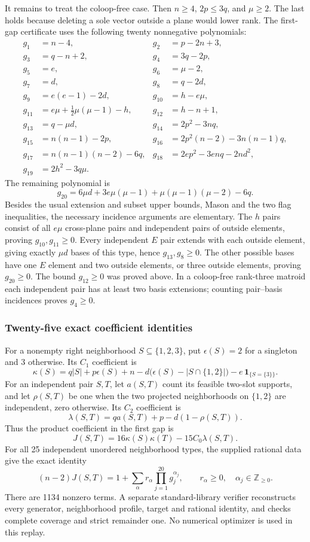 \documentclass[11pt,a4paper]{article}
\theoremstyle{remark}\newtheorem{remark}[theorem]{Remark}
\begin{document}
It remains to treat the coloop-free case. Then $n\ge4$, $2p\le3q$, and $\mu\ge2$. The last holds because deleting a sole vector outside a plane would lower rank. The first-gap certificate uses the following twenty nonnegative polynomials:
\begin{align*}
g_1&=n-4,&g_2&=p-2n+3,\\
g_3&=q-n+2,&g_4&=3q-2p,\\
g_5&=e,&g_6&=\mu-2,\\
g_7&=d,&g_8&=q-2d,\\
g_9&=e(e-1)-2d,&g_{10}&=h-e\mu,\\
g_{11}&=e\mu+\tfrac12\mu(\mu-1)-h,&g_{12}&=h-n+1,\\
g_{13}&=q-\mu d,&g_{14}&=2p^2-3nq,\\
g_{15}&=n(n-1)-2p,&g_{16}&=2p^2(n-2)-3n(n-1)q,\\
g_{17}&=n(n-1)(n-2)-6q,&g_{18}&=2ep^2-3enq-2nd^2,\\
g_{19}&=2h^2-3q\mu.&&
\end{align*}
The remaining polynomial is
\[
 g_{20}=6\mu d+3e\mu(\mu-1)+\mu(\mu-1)(\mu-2)-6q.
\]
Besides the usual extension and subset upper bounds, Mason and the two flag inequalities, the necessary incidence arguments are elementary. The $h$ pairs consist of all $e\mu$ cross-plane pairs and independent pairs of outside elements, proving $g_{10},g_{11}\ge0$. Every independent $E$ pair extends with each outside element, giving exactly $\mu d$ bases of this type, hence $g_{13},g_8\ge0$. The other possible bases have one $E$ element and two outside elements, or three outside elements, proving $g_{20}\ge0$. The bound $g_{12}\ge0$ was proved above. In a coloop-free rank-three matroid each independent pair has at least two basis extensions; counting pair--basis incidences proves $g_4\ge0$.

\subsubsection{Twenty-five exact coefficient identities}
For a nonempty right neighborhood $S\subseteq\{1,2,3\}$, put $\epsilon(S)=2$ for a singleton and $3$ otherwise. Its $C_1$ coefficient is
\[
 \kappa(S)=q|S|+p\epsilon(S)+n
 -d\bigl(\epsilon(S)-|S\cap\{1,2\}|\bigr)
 -e\,\mathbf1_{\{S=\{3\}\}}.
\]
For an independent pair $S,T$, let $a(S,T)$ count its feasible two-slot supports, and let $\rho(S,T)$ be one when the two projected neighborhoods on $\{1,2\}$ are independent, zero otherwise. Its $C_2$ coefficient is
\[
 \lambda(S,T)=qa(S,T)+p-d(1-\rho(S,T)).
\]
Thus the product coefficient in the first gap is
\[
 J(S,T)=16\kappa(S)\kappa(T)-15C_0\lambda(S,T).
\]
For all 25 independent unordered neighborhood types, the supplied rational data give the exact identity
\begin{equation}\label{mrn:e:tc:eq:certificate}
 (n-2)J(S,T)=1+\sum_\alpha r_\alpha
                \prod_{j=1}^{20}g_j^{\alpha_j},
 \qquad r_\alpha\ge0,\quad\alpha_j\in\mathbb Z_{\ge0}.
\end{equation}
There are 1134 nonzero terms. A separate standard-library verifier reconstructs every generator, neighborhood profile, target and rational identity, and checks complete coverage and strict remainder one. No numerical optimizer is used in this replay.
\end{document}
